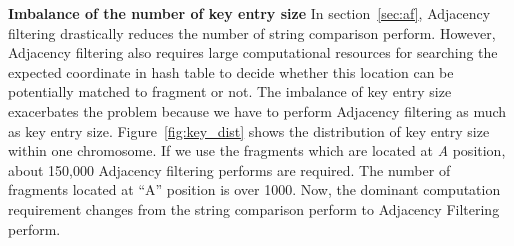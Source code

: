 \textbf{Imbalance of the number of key entry size} In section~\ref{sec:af},
Adjacency filtering drastically reduces the number of string comparison
perform. However, Adjacency filtering also requires large computational
resources for searching the expected coordinate in hash table to decide whether
this location can be potentially matched to fragment or not. The imbalance of
key entry size exacerbates the problem because we have to perform Adjacency
filtering as much as key entry size. Figure~\ref{fig:key_dist}  shows the
distribution of key entry size within one chromosome. If we use the fragments
which are located at \textit{A} position, about 150,000 Adjacency filtering performs
are required. The number of fragments located at “A” position is over 1000.
Now, the dominant computation requirement changes from the string comparison
perform to Adjacency Filtering perform.

